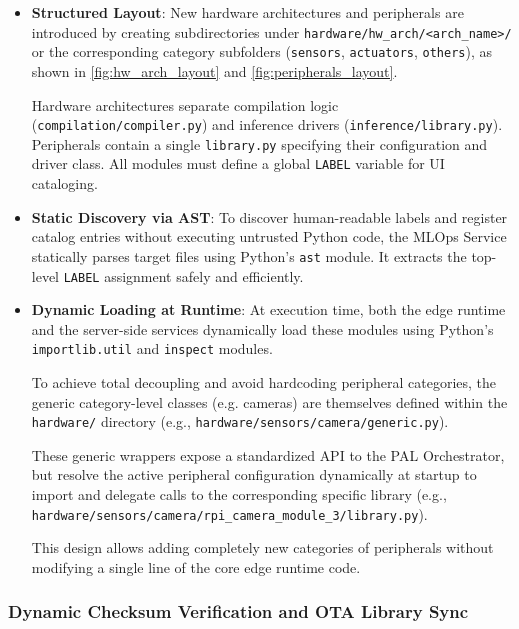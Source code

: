 \begin{itemize}
    \item \textbf{Structured Layout}: New hardware architectures and peripherals are introduced by creating subdirectories under \texttt{hardware/hw\_arch/<arch\_name>/} or the corresponding category subfolders (\texttt{sensors}, \texttt{actuators}, \texttt{others}), as shown in \autoref{fig:hw_arch_layout} and \autoref{fig:peripherals_layout}. 
    
    Hardware architectures separate compilation logic (\texttt{compilation/compiler.py}) and inference drivers (\texttt{inference/library.py}). Peripherals contain a single \texttt{library.py} specifying their configuration and driver class. All modules must define a global \texttt{LABEL} variable for \gls{UI} cataloging.
    
    \item \textbf{Static Discovery via \gls{AST}}: To discover human-readable labels and register catalog entries without executing untrusted Python code, the \gls{MLOps} Service statically parses target files using Python's \texttt{ast} module. It extracts the top-level \texttt{LABEL} assignment safely and efficiently.
    
    \item \textbf{Dynamic Loading at Runtime}: At execution time, both the edge runtime and the server-side services dynamically load these modules using Python's \texttt{importlib.util} and \texttt{inspect} modules.
    
    To achieve total decoupling and avoid hardcoding peripheral categories, the generic category-level classes (e.g. cameras) are themselves defined within the \texttt{hardware/} directory (e.g., \texttt{hardware/sensors/camera/generic.py}). 
    
    These generic wrappers expose a standardized \gls{API} to the \gls{PAL} Orchestrator, but resolve the active peripheral configuration dynamically at startup to import and delegate calls  to the corresponding specific library (e.g., \texttt{hardware/sensors/camera/rpi\_camera\_module\_3/library.py}).
    
    This design allows adding completely new categories of peripherals without modifying a single line of the core edge runtime code.
\end{itemize}

\subsubsection{Dynamic Checksum Verification and \acrshort{OTA} Library Sync}\label{sec:impl:dyn_hardware:sync}

